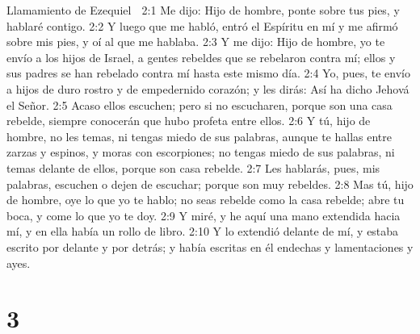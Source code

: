 Llamamiento de Ezequiel  

2:1 Me dijo: Hijo de hombre, ponte sobre tus pies, y hablaré contigo.  
2:2 Y luego que me habló, entró el Espíritu en mí y me afirmó sobre mis pies, y oí al que me hablaba.  
2:3 Y me dijo: Hijo de hombre, yo te envío a los hijos de Israel, a gentes rebeldes que se rebelaron contra mí; ellos y sus padres se han rebelado contra mí hasta este mismo día.  
2:4 Yo, pues, te envío a hijos de duro rostro y de empedernido corazón; y les dirás: Así ha dicho Jehová el Señor.  
2:5 Acaso ellos escuchen; pero si no escucharen, porque son una casa rebelde, siempre conocerán que hubo profeta entre ellos.  
2:6 Y tú, hijo de hombre, no les temas, ni tengas miedo de sus palabras, aunque te hallas entre zarzas y espinos, y moras con escorpiones; no tengas miedo de sus palabras, ni temas delante de ellos, porque son casa rebelde.  
2:7 Les hablarás, pues, mis palabras, escuchen o dejen de escuchar; porque son muy rebeldes.  
2:8 Mas tú, hijo de hombre, oye lo que yo te hablo; no seas rebelde como la casa rebelde; abre tu boca, y come lo que yo te doy.  
2:9 Y miré, y he aquí una mano extendida hacia mí, y en ella había un rollo de libro.  
2:10 Y lo extendió delante de mí, y estaba escrito por delante y por detrás; y había escritas en él endechas y lamentaciones y ayes.  

\chapter{3}

